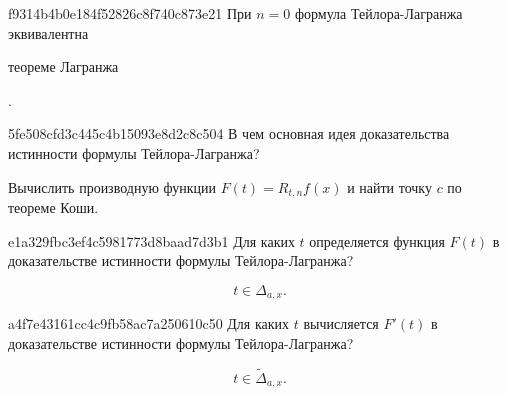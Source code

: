 
\begin{note}{f9314b4b0e184f52826c8f740c873e21}
    При \( n = 0 \) формула Тейлора-Лагранжа эквивалентна \begin{icloze}{1}теореме Лагранжа\end{icloze}.
\end{note}

\begin{note}{5fe508cfd3c445c4b15093e8d2c8c504}
    В чем основная идея доказательства истинности формулы Тейлора-Лагранжа?

    \begin{cloze}{1}
        Вычислить производную функции \( F(t) = R_{t, n} f(x) \) и найти точку \( c \) по теореме Коши.
    \end{cloze}
\end{note}

\begin{note}{e1a329fbc3ef4c5981773d8baad7d3b1}
    Для каких \( t \) определяется функция \( F(t) \) в доказательстве истинности формулы Тейлора-Лагранжа?

    \begin{cloze}{1}
        \[
            t \in \Delta _{a, x}.
        \]
    \end{cloze}
\end{note}

\begin{note}{a4f7e43161cc4c9fb58ac7a250610c50}
    Для каких \( t \) вычисляется \( F'(t) \) в доказательстве истинности формулы Тейлора-Лагранжа?

    \begin{cloze}{1}
        \[
            t \in \widetilde \Delta _{a, x}.
        \]
    \end{cloze}
\end{note}

